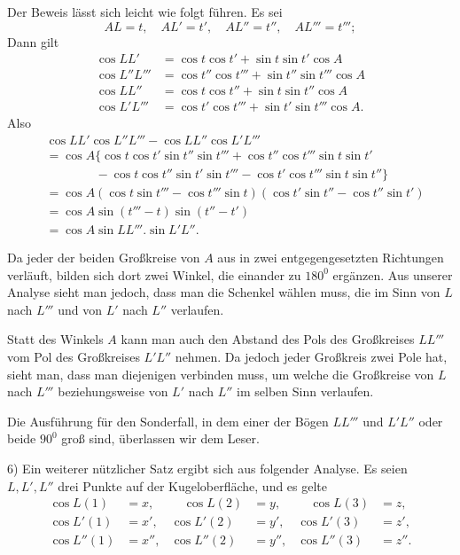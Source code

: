 \par{}%
\noindent\hspace*{1.2em}Der Beweis lässt sich leicht wie folgt führen. Es sei
\[
AL=t,\quad AL'=t',\quad AL''=t'',\quad AL'''=t''';
\]
Dann gilt
\[
\begin{aligned}
\cos LL'&=\cos t\cos t'+\sin t\sin t'\cos A\\
\cos L''L'''&=\cos t''\cos t'''+\sin t''\sin t'''\cos A\\
\cos LL''&=\cos t\cos t''+\sin t\sin t''\cos A\\
\cos L'L'''&=\cos t'\cos t'''+\sin t'\sin t'''\cos A.
\end{aligned}
\]
Also
\[
\begin{aligned}
&\cos LL'\cos L''L'''-\cos LL''\cos L'L'''\\
&=\cos A\{\cos t\cos t'\sin t''\sin t'''+\cos t''\cos t'''\sin t\sin t'\\
&\qquad\qquad-\cos t\cos t''\sin t'\sin t'''-\cos t'\cos t'''\sin t\sin t''\}\\
&=\cos A(\cos t\sin t'''-\cos t'''\sin t)(\cos t'\sin t''-\cos t''\sin t')\\
&=\cos A\sin(t'''-t)\sin(t''-t')\\
&=\cos A\sin LL'''.\sin L'L''.
\end{aligned}
\]

Da jeder der beiden Großkreise von $A$ aus in zwei entgegengesetzten Richtungen verläuft, bilden sich dort zwei Winkel, die einander zu $180^{0}$ ergänzen. Aus unserer Analyse sieht man jedoch, dass man die Schenkel wählen muss, die im Sinn von $L$ nach $L'''$ und von $L'$ nach $L''$ verlaufen.

Statt des Winkels $A$ kann man auch den Abstand des Pols des Großkreises $LL'''$ vom Pol des Großkreises $L'L''$ nehmen. Da jedoch jeder Großkreis zwei Pole hat, sieht man, dass man diejenigen verbinden muss, um welche die Großkreise von $L$ nach $L'''$ beziehungsweise von $L'$ nach $L''$ im selben Sinn verlaufen.

Die Ausführung für den Sonderfall, in dem einer der Bögen $LL'''$ und $L'L''$ oder beide $90^{0}$ groß sind, überlassen wir dem Leser.

6) Ein weiterer nützlicher Satz ergibt sich aus folgender Analyse. Es seien $L,L',L''$ drei Punkte auf der Kugeloberfläche, und es gelte
\[
\begin{aligned}
\cos L(1)&=x,&\quad\cos L(2)&=y,&\quad\cos L(3)&=z,\\
\cos L'(1)&=x',&\cos L'(2)&=y',&\cos L'(3)&=z',\\
\cos L''(1)&=x'',&\cos L''(2)&=y'',&\cos L''(3)&=z''.
\end{aligned}
\]
